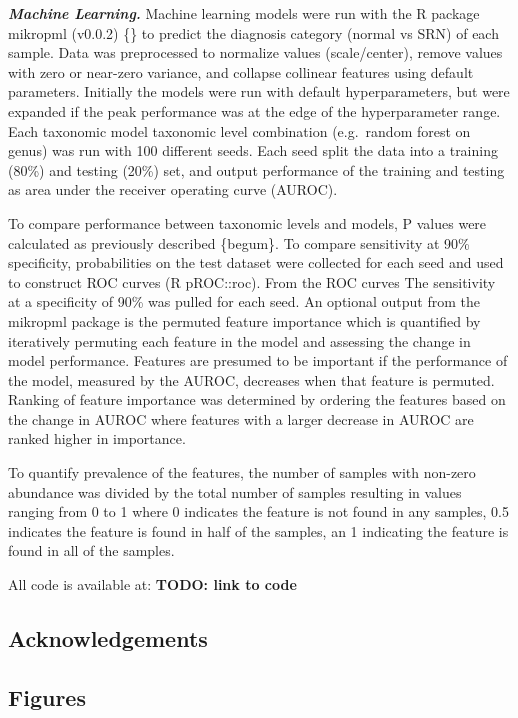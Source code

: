 \documentclass[
]{article}
\begin{document}
\textbf{\emph{Machine Learning.}} Machine learning models were run with
the R package mikropml (v0.0.2) \{\} to predict the diagnosis category
(normal vs SRN) of each sample. Data was preprocessed to normalize
values (scale/center), remove values with zero or near-zero variance,
and collapse collinear features using default parameters. Initially the
models were run with default hyperparameters, but were expanded if the
peak performance was at the edge of the hyperparameter range. Each
taxonomic model taxonomic level combination (e.g.~random forest on
genus) was run with 100 different seeds. Each seed split the data into a
training (80\%) and testing (20\%) set, and output performance of the
training and testing as area under the receiver operating curve (AUROC).

To compare performance between taxonomic levels and models, P values
were calculated as previously described \{begum\}. To compare
sensitivity at 90\% specificity, probabilities on the test dataset were
collected for each seed and used to construct ROC curves (R pROC::roc).
From the ROC curves The sensitivity at a specificity of 90\% was pulled
for each seed. An optional output from the mikropml package is the
permuted feature importance which is quantified by iteratively permuting
each feature in the model and assessing the change in model performance.
Features are presumed to be important if the performance of the model,
measured by the AUROC, decreases when that feature is permuted. Ranking
of feature importance was determined by ordering the features based on
the change in AUROC where features with a larger decrease in AUROC are
ranked higher in importance.

To quantify prevalence of the features, the number of samples with
non-zero abundance was divided by the total number of samples resulting
in values ranging from 0 to 1 where 0 indicates the feature is not found
in any samples, 0.5 indicates the feature is found in half of the
samples, an 1 indicating the feature is found in all of the samples.

All code is available at: \textbf{TODO: link to code}

\hypertarget{acknowledgements}{%
\subsection{Acknowledgements}\label{acknowledgements}}

\newpage

\hypertarget{figures}{%
\subsection{Figures}\label{figures}}
\end{document}
